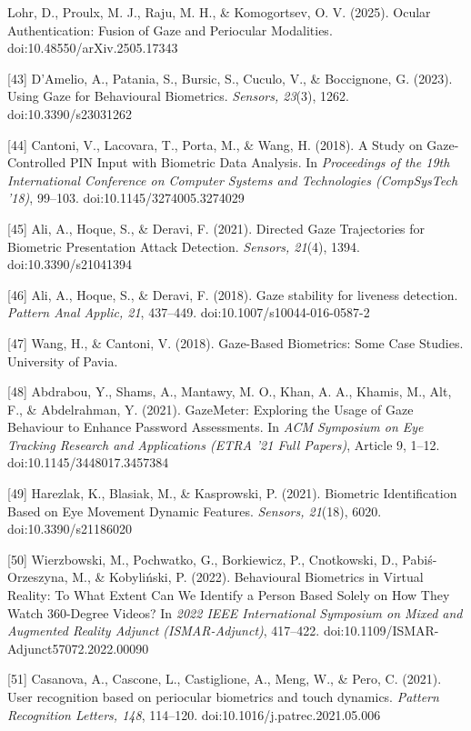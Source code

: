 \documentclass[12pt]{report}
\begin{document}
\begin{raggedright}
[42] Lohr, D., Proulx, M. J., Raju, M. H., \& Komogortsev, O. V. (2025). Ocular Authentication: Fusion of Gaze and Periocular Modalities. doi:10.48550/arXiv.2505.17343

[43] D'Amelio, A., Patania, S., Bursic, S., Cuculo, V., \& Boccignone, G. (2023). Using Gaze for Behavioural Biometrics. \textit{Sensors, 23}(3), 1262. doi:10.3390/s23031262

[44] Cantoni, V., Lacovara, T., Porta, M., \& Wang, H. (2018). A Study on Gaze-Controlled PIN Input with Biometric Data Analysis. In \textit{Proceedings of the 19th International Conference on Computer Systems and Technologies (CompSysTech '18)}, 99–103. doi:10.1145/3274005.3274029

[45] Ali, A., Hoque, S., \& Deravi, F. (2021). Directed Gaze Trajectories for Biometric Presentation Attack Detection. \textit{Sensors, 21}(4), 1394. doi:10.3390/s21041394

[46] Ali, A., Hoque, S., \& Deravi, F. (2018). Gaze stability for liveness detection. \textit{Pattern Anal Applic, 21}, 437–449. doi:10.1007/s10044-016-0587-2

[47] Wang, H., \& Cantoni, V. (2018). Gaze-Based Biometrics: Some Case Studies. University of Pavia.

[48] Abdrabou, Y., Shams, A., Mantawy, M. O., Khan, A. A., Khamis, M., Alt, F., \& Abdelrahman, Y. (2021). GazeMeter: Exploring the Usage of Gaze Behaviour to Enhance Password Assessments. In \textit{ACM Symposium on Eye Tracking Research and Applications (ETRA '21 Full Papers)}, Article 9, 1–12. doi:10.1145/3448017.3457384

[49] Harezlak, K., Blasiak, M., \& Kasprowski, P. (2021). Biometric Identification Based on Eye Movement Dynamic Features. \textit{Sensors, 21}(18), 6020. doi:10.3390/s21186020

[50] Wierzbowski, M., Pochwatko, G., Borkiewicz, P., Cnotkowski, D., Pabiś-Orzeszyna, M., \& Kobyliński, P. (2022). Behavioural Biometrics in Virtual Reality: To What Extent Can We Identify a Person Based Solely on How They Watch 360-Degree Videos? In \textit{2022 IEEE International Symposium on Mixed and Augmented Reality Adjunct (ISMAR-Adjunct)}, 417–422. doi:10.1109/ISMAR-Adjunct57072.2022.00090

[51] Casanova, A., Cascone, L., Castiglione, A., Meng, W., \& Pero, C. (2021). User recognition based on periocular biometrics and touch dynamics. \textit{Pattern Recognition Letters, 148}, 114–120. doi:10.1016/j.patrec.2021.05.006


\end{raggedright}
\end{document}
